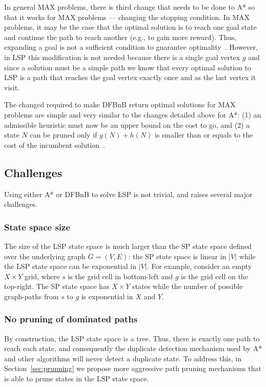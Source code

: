 \documentclass[letterpaper]{article} %
\begin{document}
In general MAX problems, there is third change that needs to be done to A* so that it works for MAX problems --- changing the stopping condition. In MAX problems, it may be the case that the optimal solution is to reach one goal state and continue the path to reach another (e.g., to gain more reward). Thus, expanding a goal is not a sufficient condition to guarantee optimality~\cite{DBLP:conf/socs/SternKPFR14}. However, in LSP this modification is not needed because there is a single goal vertex $g$ and since a solution must be a simple path we know that every optimal solution to LSP is a path that reaches the goal vertex exactly once and as the last vertex it visit.


The changed required to make DFBnB return optimal solutions for MAX problems are simple and very similar to the changes detailed above for A*:
(1) an admissible heuristic must now be an upper bound on the cost to go, and (2) a state $N$ can be pruned only if $g(N)+h(N)$ is smaller than or equals to the cost of the incumbent solution~\cite{DBLP:conf/socs/SternKPFR14}.


\subsection{Challenges}
Using either A* or DFBnB to solve LSP is not trivial, and raises several major challenges.
\subsubsection{State space size}
The size of the LSP state space is much larger than the SP state space defined over the underlying graph $G=(V,E)$: the SP state space is linear in $|V|$ while the LSP state space can be exponential in $|V|$.
For example, consider an empty $X\times Y$ grid, where $s$ is the grid cell in bottom-left and $g$ is the grid cell on the top-right.
The SP state space has $X\times Y$ states while the number of possible graph-paths from $s$ to $g$ is exponential in $X$ and $Y$.


\subsubsection{No pruning of dominated paths}
By construction, the LSP state space is a tree. Thus, there is exactly one path to reach each state, and consequently the duplicate detection mechanism used by A* and other algorithms will never detect a duplicate state. To address this, in Section~\ref{sec:prunning} we propose more aggressive path pruning mechanisms that is able to prune states in the LSP state space.
\end{document}
